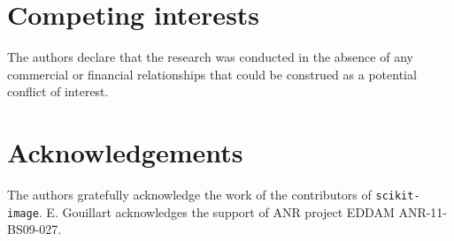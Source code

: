 \documentclass[twocolumn]{bmcart}%
\begin{document}
\begin{backmatter}

\section*{Competing interests}
The authors declare that the research was conducted
in the absence of any commercial or financial relationships that could be
construed as a potential conflict of interest.

\section*{Acknowledgements}
  
The authors gratefully acknowledge the work of the contributors of
  \texttt{scikit-image}. E. Gouillart acknowledges the support of ANR
  project EDDAM ANR-11-BS09-027.


\nocite{label}




\end{backmatter}
\end{document}
